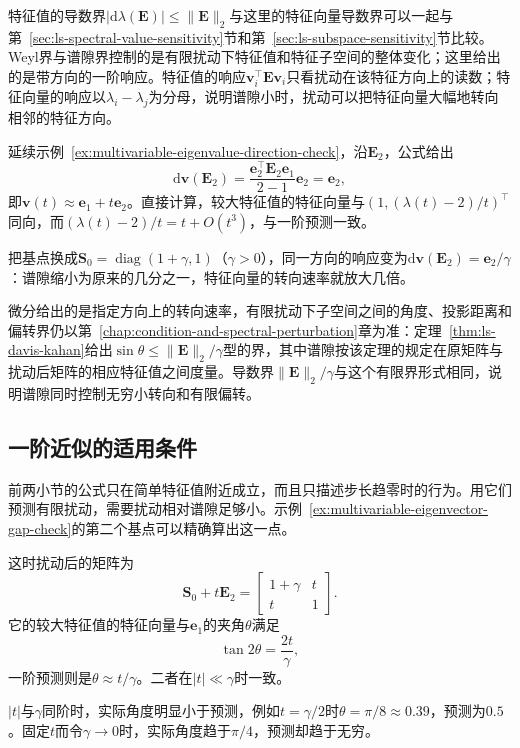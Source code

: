 特征值的导数界$|\mathrm d\lambda(\bm E)|\leq\lVert\bm E\rVert_2$与这里的特征向量导数界可以一起与第~\ref{sec:ls-spectral-value-sensitivity}节和第~\ref{sec:ls-subspace-sensitivity}节比较。Weyl界与谱隙界控制的是有限扰动下特征值和特征子空间的整体变化；这里给出的是带方向的一阶响应。特征值的响应$\bm v_i^\top\bm E\bm v_i$只看扰动在该特征方向上的读数；特征向量的响应以$\lambda_i-\lambda_j$为分母，说明谱隙小时，扰动可以把特征向量大幅地转向相邻的特征方向。
\begin{example}[特征向量的转向与谱隙]
\label{ex:multivariable-eigenvector-gap-check}
延续示例~\ref{ex:multivariable-eigenvalue-direction-check}，沿$\bm E_2$，公式给出
\[
 \mathrm d\bm v(\bm E_2)=\frac{\bm e_2^\top\bm E_2\bm e_1}{2-1}\bm e_2=\bm e_2 ,
\]
即$\bm v(t)\approx\bm e_1+t\bm e_2$。直接计算，较大特征值的特征向量与$(1,(\lambda(t)-2)/t)^\top$同向，而$(\lambda(t)-2)/t=t+O(t^3)$，与一阶预测一致。

把基点换成$\bm S_0=\operatorname{diag}(1+\gamma,1)$（$\gamma>0$），同一方向的响应变为$\mathrm d\bm v(\bm E_2)=\bm e_2/\gamma$：谱隙缩小为原来的几分之一，特征向量的转向速率就放大几倍。
\end{example}

微分给出的是指定方向上的转向速率，有限扰动下子空间之间的角度、投影距离和偏转界仍以第~\ref{chap:condition-and-spectral-perturbation}章为准：定理~\ref{thm:ls-davis-kahan}给出$\sin\theta\leq\lVert\bm E\rVert_2/\gamma$型的界，其中谱隙按该定理的规定在原矩阵与扰动后矩阵的相应特征值之间度量。导数界$\lVert\bm E\rVert_2/\gamma$与这个有限界形式相同，说明谱隙同时控制无穷小转向和有限偏转。

\subsection{一阶近似的适用条件}
\label{sec:multivariable-eigen-first-order-validity}

前两小节的公式只在简单特征值附近成立，而且只描述步长趋零时的行为。用它们预测有限扰动，需要扰动相对谱隙足够小。示例~\ref{ex:multivariable-eigenvector-gap-check}的第二个基点可以精确算出这一点。

这时扰动后的矩阵为
\[
 \bm S_0+t\bm E_2=\begin{bmatrix}1+\gamma&t\\t&1\end{bmatrix}.
\]
它的较大特征值的特征向量与$\bm e_1$的夹角$\theta$满足
\[
 \tan2\theta=\frac{2t}\gamma ,
\]
一阶预测则是$\theta\approx t/\gamma$。二者在$|t|\ll\gamma$时一致。

$|t|$与$\gamma$同阶时，实际角度明显小于预测，例如$t=\gamma/2$时$\theta=\pi/8\approx0.39$，预测为$0.5$。固定$t$而令$\gamma\to0$时，实际角度趋于$\pi/4$，预测却趋于无穷。


